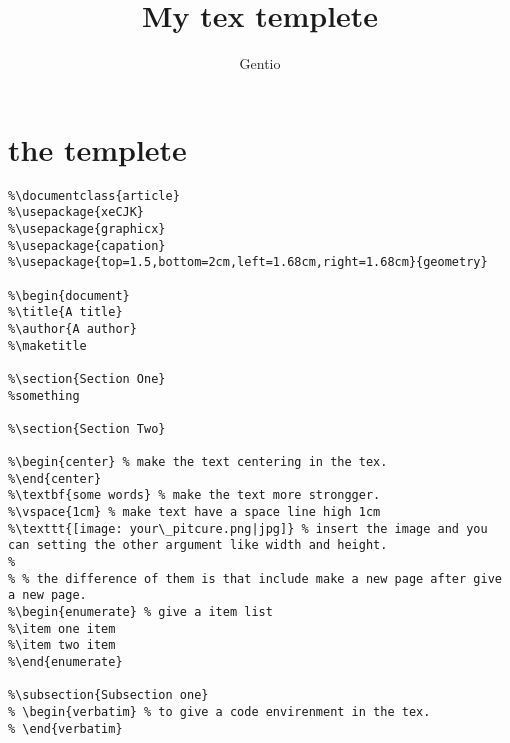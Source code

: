 \documentclass{article}
\begin{document}
\title{My tex templete}
\author{Gentio}
\maketitle

\section{the templete}
\begin{verbatim}
%\documentclass{article}
%\usepackage{xeCJK}
%\usepackage{graphicx}
%\usepackage{capation}
%\usepackage{top=1.5,bottom=2cm,left=1.68cm,right=1.68cm}{geometry}

%\begin{document}
%\title{A title}
%\author{A author}
%\maketitle

%\section{Section One}
%something

%\section{Section Two}

%\begin{center} % make the text centering in the tex.
%\end{center}
%\textbf{some words} % make the text more strongger.
%\vspace{1cm} % make text have a space line high 1cm
%\texttt{[image: your\_pitcure.png|jpg]} % insert the image and you can setting the other argument like width and height.
%
% % the difference of them is that include make a new page after give a new page.
%\begin{enumerate} % give a item list
%\item one item
%\item two item
%\end{enumerate}

%\subsection{Subsection one}
% \begin{verbatim} % to give a code envirenment in the tex.
% \end{verbatim}
\end{verbatim}
\end{document}
